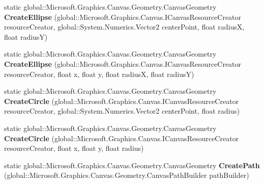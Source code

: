 \begin{DoxyCompactItemize}
static global\+::\+Microsoft.\+Graphics.\+Canvas.\+Geometry.\+Canvas\+Geometry {\bfseries Create\+Ellipse} (global\+::\+Microsoft.\+Graphics.\+Canvas.\+I\+Canvas\+Resource\+Creator resource\+Creator, global\+::\+System.\+Numerics.\+Vector2 center\+Point, float radiusX, float radiusY)
\item 
\mbox{\label{class_microsoft_1_1_graphics_1_1_canvas_1_1_geometry_1_1_canvas_geometry_a60460178970082d9e7b6673b17fb88ec}} 
static global\+::\+Microsoft.\+Graphics.\+Canvas.\+Geometry.\+Canvas\+Geometry {\bfseries Create\+Ellipse} (global\+::\+Microsoft.\+Graphics.\+Canvas.\+I\+Canvas\+Resource\+Creator resource\+Creator, float x, float y, float radiusX, float radiusY)
\item 
\mbox{\label{class_microsoft_1_1_graphics_1_1_canvas_1_1_geometry_1_1_canvas_geometry_a098a43184492d859176fd9ccac7a99b9}} 
static global\+::\+Microsoft.\+Graphics.\+Canvas.\+Geometry.\+Canvas\+Geometry {\bfseries Create\+Circle} (global\+::\+Microsoft.\+Graphics.\+Canvas.\+I\+Canvas\+Resource\+Creator resource\+Creator, global\+::\+System.\+Numerics.\+Vector2 center\+Point, float radius)
\item 
\mbox{\label{class_microsoft_1_1_graphics_1_1_canvas_1_1_geometry_1_1_canvas_geometry_aa92a58291260e1f96f156e7d47e03c3d}} 
static global\+::\+Microsoft.\+Graphics.\+Canvas.\+Geometry.\+Canvas\+Geometry {\bfseries Create\+Circle} (global\+::\+Microsoft.\+Graphics.\+Canvas.\+I\+Canvas\+Resource\+Creator resource\+Creator, float x, float y, float radius)
\item 
\mbox{\label{class_microsoft_1_1_graphics_1_1_canvas_1_1_geometry_1_1_canvas_geometry_a7a89ba595e7afee0fe55e1dd7c7c4315}} 
static global\+::\+Microsoft.\+Graphics.\+Canvas.\+Geometry.\+Canvas\+Geometry {\bfseries Create\+Path} (global\+::\+Microsoft.\+Graphics.\+Canvas.\+Geometry.\+Canvas\+Path\+Builder path\+Builder)
\item 
\mbox{\label{class_microsoft_1_1_graphics_1_1_canvas_1_1_geometry_1_1_canvas_geometry_a1f5119d034d404cb9dc30ac067fcc1d1}} 

\end{DoxyCompactItemize}
